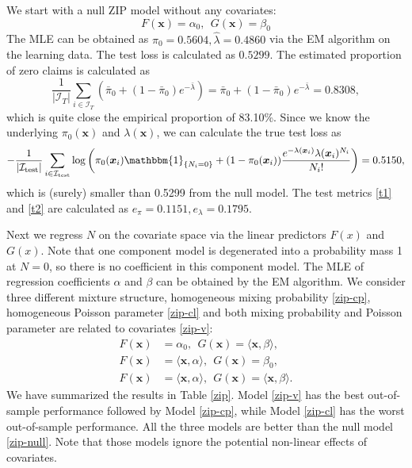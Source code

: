 \documentclass[11pt]{article}
\numberwithin{equation}{section}
\def\bx{\boldsymbol{x}}
\begin{document}
We start with a null ZIP model without any covariates:
\begin{equation}\label{zip-null}
F(\bx)=\alpha_0, ~~G(\bx)=\beta_0 
\end{equation}
The MLE can be obtained as $\hat{\pi}_0=0.5604, \hat{\lambda}=0.4860$ via the EM algorithm on the learning data.
The test loss is calculated as $0.5299$. 
The estimated proportion of zero claims is calculated as 
$$\frac{1}{|\mathcal{I}_T|}\sum_{i\in\mathcal{I}_T}\left(\bar{\pi}_0+(1-\bar{\pi}_0)e^{-\bar{\lambda}}\right)=\bar{\pi}_0+(1-\bar{\pi}_0)e^{-\bar{\lambda}}=0.8308,$$
which is quite close the empirical proportion of 83.10\%.
Since we know the underlying $\pi_0(\bx)$ and $\lambda(\bx)$, we can calculate the true test loss as 
\begin{equation}
	-\frac{1}{|\mathcal{I}_\text{test}|}\sum_{i\in\mathcal{I}_\text{test}}\log \left({\pi}_0(\bx_i)\mathbbm{1}_{\{N_i=0\}} + 
	(1-{\pi}_0(\bx_i))\frac{e^{-{\lambda}(\bx_i)}{\lambda}(\bx_i)^{N_i}}{N_i!}\right)=0.5150,
\end{equation}   
which is (surely) smaller than 0.5299 from the null model.
The test metrics \eqref{t1} and \eqref{t2} are calculated as $e_\pi=0.1151, e_\lambda=0.1795$.


Next we regress $N$ on the covariate space via the linear predictors $F(x)$ and $G(x)$.
Note that one component model is degenerated into a probability mass 1 at $N=0$, so there is no coefficient in this component model. The MLE of regression coefficients $\alpha$ and $\beta$ can be obtained by the EM algorithm.
We consider three different mixture structure, homogeneous mixing probability \eqref{zip-cp}, homogeneous Poisson parameter \eqref{zip-cl} and both  mixing probability and Poisson parameter are related to covariates \eqref{zip-v}:
\begin{align}
F(\bx)&=\alpha_0, ~~G(\bx)=\langle \bx,\beta\rangle, \label{zip-cp} \\
F(\bx)&=\langle \bx,\alpha\rangle, ~~G(\bx)=\beta_0, \label{zip-cl} \\
F(\bx)&=\langle \bx,\alpha\rangle, ~~G(\bx)=\langle \bx,\beta\rangle. \label{zip-v}
\end{align}  
We have summarized the results in Table \ref{zip}.
Model \eqref{zip-v} has the best out-of-sample performance followed by Model \eqref{zip-cp}, while Model \eqref{zip-cl} has the worst out-of-sample performance.
All the three models are better than the null model \eqref{zip-null}.
Note that those models ignore the potential non-linear effects of covariates.
\end{document}
